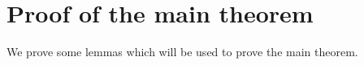 \documentclass[a4paper,11pt]{amsart}
\numberwithin{equation}{section}
\theoremstyle{definition}
\begin{document}
\section{Proof of the main theorem}
 We prove some lemmas which will be used to prove the main theorem.

\end{document}
